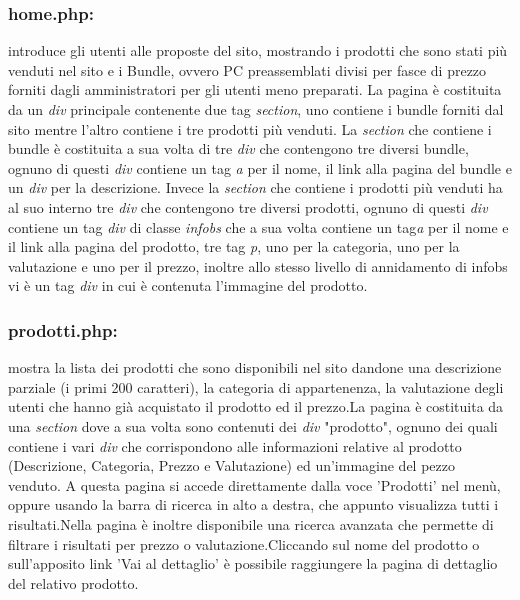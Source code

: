  \subsubsection{home.php:} \Spazio introduce gli utenti alle proposte del sito, mostrando i prodotti che sono stati più venduti nel sito e i Bundle, ovvero PC preassemblati divisi per fasce di prezzo forniti dagli amministratori per gli utenti meno preparati. \newline
 La pagina è costituita da un \emph{div} principale contenente due tag \emph{section}, uno contiene i bundle forniti dal sito mentre l'altro contiene i tre prodotti più venduti. \newline
 La \emph{section} che contiene i bundle è costituita a sua volta di tre \emph{div} che contengono tre diversi bundle, ognuno di questi \emph{div} contiene un tag \emph{a} per il nome, il link alla pagina del bundle e un \emph{div} per la descrizione.\newline
 Invece la \emph{section} che contiene i prodotti più venduti ha al suo interno tre \emph{div} che contengono tre diversi prodotti, ognuno di questi \emph{div} contiene un tag \emph{div} di classe \emph{infobs} che a sua volta contiene un tag\emph{a} per il nome e il link alla pagina del prodotto, tre tag \emph{p}, uno per la categoria, uno per la valutazione e uno per il prezzo, inoltre allo stesso livello di annidamento di infobs vi è un tag \emph{div} in cui è contenuta l'immagine del prodotto.
 
\subsubsection{prodotti.php:} \Spazio mostra la lista dei prodotti che sono disponibili nel sito dandone una descrizione parziale (i primi 200 caratteri), la categoria di appartenenza, la valutazione degli utenti che hanno già acquistato il prodotto ed il prezzo.\newline La pagina è costituita da una \emph{section} dove a sua volta sono contenuti dei \emph{div} "prodotto", ognuno dei quali contiene i vari \emph{div} che corrispondono alle informazioni relative al prodotto (Descrizione, Categoria, Prezzo e Valutazione) ed un'immagine del pezzo venduto. A questa pagina si accede direttamente dalla voce 'Prodotti' nel menù, oppure usando la barra di ricerca in alto a destra, che appunto visualizza tutti i risultati.\newline Nella pagina è inoltre disponibile una ricerca avanzata che permette di filtrare i risultati per prezzo o valutazione.\newline Cliccando sul nome del prodotto o sull'apposito link 'Vai al dettaglio' è possibile raggiungere la pagina di dettaglio del relativo prodotto.


